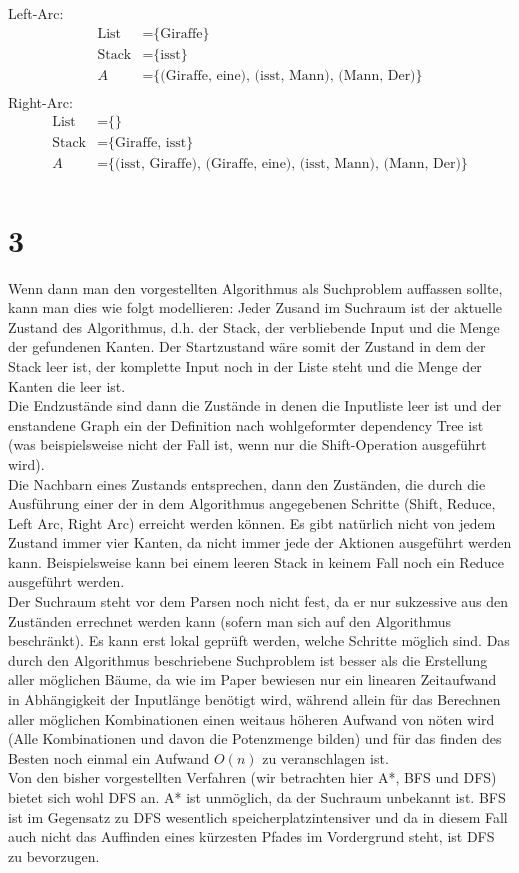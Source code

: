 \documentclass[a4paper,11pt,fleqn]{scrartcl}
\begin{document}
Left-Arc:
\begin{align}
	\text{List} &= \text{\{Giraffe\}} \\ 
	\text{Stack} &= \text{\{isst\}} \\
	A &= \text{\{(Giraffe, eine), (isst, Mann), (Mann, Der)\}} \\	
\end{align}
Right-Arc:
\begin{align}
	\text{List} &= \text{\{\}} \\ 
	\text{Stack} &= \text{\{Giraffe, isst\}} \\
	A &= \text{\{(isst, Giraffe), (Giraffe, eine), (isst, Mann), (Mann, Der)\}} \\	
\end{align}


\section*{3}
Wenn dann man den vorgestellten Algorithmus als Suchproblem auffassen sollte, kann man dies wie folgt modellieren: 
Jeder Zusand im Suchraum ist der aktuelle Zustand des Algorithmus, d.h. der Stack, der verbliebende Input und die Menge der gefundenen Kanten. 
Der Startzustand wäre somit der Zustand in dem der Stack leer ist, der komplette Input noch in der Liste steht und die Menge der Kanten die leer ist.\\
Die Endzustände sind dann die Zustände in denen die Inputliste leer ist und der enstandene Graph ein der Definition nach wohlgeformter dependency Tree ist (was beispielsweise nicht der Fall ist, wenn nur die Shift-Operation ausgeführt wird).\\
Die Nachbarn eines Zustands entsprechen, dann den Zuständen, die durch die Ausführung einer der in dem Algorithmus angegebenen Schritte (Shift, Reduce, Left Arc, Right Arc) erreicht werden können. 
Es gibt natürlich nicht von jedem Zustand immer vier Kanten, da nicht immer jede der Aktionen ausgeführt werden kann. 
Beispielsweise kann bei einem leeren Stack in keinem Fall noch ein Reduce ausgeführt werden.\\
Der Suchraum steht vor dem Parsen noch nicht fest, da er nur sukzessive aus den Zuständen errechnet werden kann (sofern man sich auf den Algorithmus beschränkt). 
Es kann erst lokal geprüft werden, welche Schritte möglich sind.
Das durch den Algorithmus beschriebene Suchproblem ist besser als die Erstellung aller möglichen Bäume, da wie im Paper bewiesen nur ein linearen Zeitaufwand in Abhängigkeit der Inputlänge benötigt wird, während allein für das Berechnen aller möglichen Kombinationen einen weitaus höheren Aufwand von nöten wird (Alle Kombinationen und davon die Potenzmenge bilden) und für das finden des Besten noch einmal ein Aufwand \(O(n)\) zu veranschlagen ist. \\
Von den bisher vorgestellten Verfahren (wir betrachten hier A*, BFS und DFS) bietet sich wohl  DFS an. 
A* ist unmöglich, da der Suchraum unbekannt ist.
BFS ist im Gegensatz zu DFS wesentlich speicherplatzintensiver und da in diesem Fall auch nicht das Auffinden eines kürzesten Pfades im Vordergrund steht, ist DFS zu bevorzugen.
\end{document}
